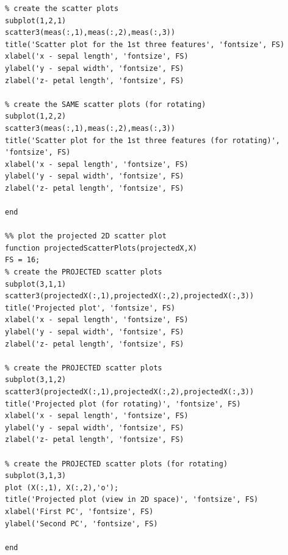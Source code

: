 \documentclass[paper=a4, fontsize=11pt]{scrartcl} %
\numberwithin{equation}{section} %
\numberwithin{figure}{section} %
\numberwithin{table}{section} %
\begin{document}
\begin{lstlisting}
% create the scatter plots
subplot(1,2,1)
scatter3(meas(:,1),meas(:,2),meas(:,3))
title('Scatter plot for the 1st three features', 'fontsize', FS)
xlabel('x - sepal length', 'fontsize', FS)
ylabel('y - sepal width', 'fontsize', FS)
zlabel('z- petal length', 'fontsize', FS)

% create the SAME scatter plots (for rotating)
subplot(1,2,2)
scatter3(meas(:,1),meas(:,2),meas(:,3))
title('Scatter plot for the 1st three features (for rotating)', 'fontsize', FS)
xlabel('x - sepal length', 'fontsize', FS)
ylabel('y - sepal width', 'fontsize', FS)
zlabel('z- petal length', 'fontsize', FS)

end

%% plot the projected 2D scatter plot 
function projectedScatterPlots(projectedX,X)
FS = 16;
% create the PROJECTED scatter plots
subplot(3,1,1)
scatter3(projectedX(:,1),projectedX(:,2),projectedX(:,3))
title('Projected plot', 'fontsize', FS)
xlabel('x - sepal length', 'fontsize', FS)
ylabel('y - sepal width', 'fontsize', FS)
zlabel('z- petal length', 'fontsize', FS)

% create the PROJECTED scatter plots
subplot(3,1,2)
scatter3(projectedX(:,1),projectedX(:,2),projectedX(:,3))
title('Projected plot (for rotating)', 'fontsize', FS)
xlabel('x - sepal length', 'fontsize', FS)
ylabel('y - sepal width', 'fontsize', FS)
zlabel('z- petal length', 'fontsize', FS)

% create the PROJECTED scatter plots (for rotating)
subplot(3,1,3)
plot (X(:,1), X(:,2),'o');
title('Projected plot (view in 2D space)', 'fontsize', FS)
xlabel('First PC', 'fontsize', FS)
ylabel('Second PC', 'fontsize', FS)

end

\end{lstlisting}
\end{document}

